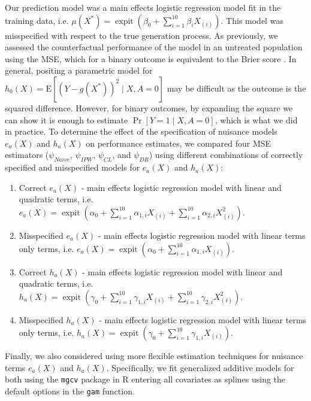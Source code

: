 Our prediction model was a main effects logistic regression model fit in the training data, i.e. $\mu\left(X^*\right) = \operatorname{expit}(\beta_0 + \sum_{i=1}^{10} \beta_i X_{(i)})$. This model was misspecified with respect to the true generation process. As previously, we assessed the counterfactual performance of the model in an untreated population using the MSE, which for a binary outcome is equivalent to the Brier score \cite{brier_verification_1950}. In general, positing a parametric model for $h_0(X)=\mathrm{E}[(Y-g\left(X^*\right))^2 \mid X, A=0]$ may be difficult as the outcome is the squared difference. However, for binary outcomes, by expanding the square we can show it is enough to estimate $\operatorname{Pr}[Y=1 \mid X, A=0]$, which is what we did in practice. To determine the effect of the specification of nuisance models $e_a(X)$ and $h_a(X)$ on performance estimates, we compared four MSE estimators (${\psi}_{Naive}$, ${\psi}_{IPW}$, ${\psi}_{CL}$, and ${\psi}_{DR}$) using different combinations of correctly specified and misspecified models for $e_a(X)$ and $h_a(X)$:
\begin{enumerate}
    \item Correct $e_a(X)$ - main effects logistic regression model with linear and quadratic terms, i.e. $e_a(X) = \operatorname{expit}(\alpha_0 + \sum_{i=1}^{10} \alpha_{1,i} X_{(i)} + \sum_{i=1}^{10} \alpha_{2,i} X_{(i)}^2)$.
    \item Misspecified $e_a(X)$ - main effects logistic regression model with linear terms only terms, i.e. $e_a(X) = \operatorname{expit}(\alpha_0 + \sum_{i=1}^{10} \alpha_{1,i} X_{(i)})$.
    \item Correct $h_a(X)$ - main effects logistic regression model with linear and quadratic terms, i.e. $h_a(X) = \operatorname{expit}(\gamma_0 + \sum_{i=1}^{10} \gamma_{1,i} X_{(i)} + \sum_{i=1}^{10} \gamma_{2,i} X_{(i)}^2)$.
    \item Misspecified $h_a(X)$ - main effects logistic regression model with linear terms only terms, i.e. $h_a(X) = \operatorname{expit}(\gamma_0 + \sum_{i=1}^{10} \gamma_{1,i} X_{(i)})$.
\end{enumerate}
Finally, we also considered using more flexible estimation techniques for nuisance terms $e_a(X)$ and $h_a(X)$. Specifically, we fit generalized additive models for both using the \texttt{mgcv} package in $\mathrm{R}$ entering all covariates as splines using the default options in the \texttt{gam} function.

